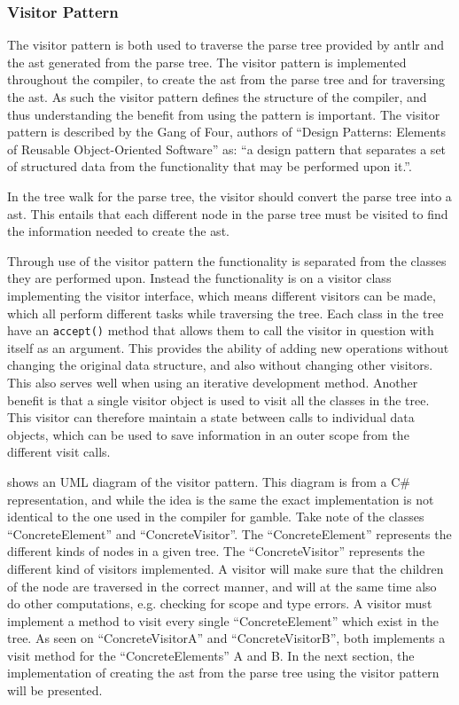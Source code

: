 \subsubsection*{Visitor Pattern}\label{subs:visit}
The visitor pattern is both used to traverse the parse tree provided by \gls{antlr} and the \acrshort{ast} generated from the parse tree.
The visitor pattern is implemented throughout the compiler, to create the \acrshort{ast} from the parse tree and for traversing the \acrshort{ast}.
As such the visitor pattern defines the structure of the compiler, and thus understanding the benefit from using the pattern is important.
The visitor pattern is described by the Gang of Four, authors of ``Design Patterns: Elements of Reusable Object-Oriented Software'' as:
``a design pattern that separates a set of structured data from the functionality that may be performed upon it.''. \citep{GOF}

In the tree walk for the parse tree, the visitor should convert the parse tree into a \acrshort{ast}.
This entails that each different node in the parse tree must be visited to find the information needed to create the \acrshort{ast}.

Through use of the visitor pattern the functionality is separated from the classes they are performed upon. 
Instead the functionality is on a visitor class implementing the visitor interface, which means different visitors can be made, which all perform different tasks while traversing the tree. 
Each class in the tree have an \texttt{accept()} method that allows them to call the visitor in question with itself as an argument.
This provides the ability of adding new operations without changing the original data structure, and also without changing other visitors.
This also serves well when using an iterative development method.
Another benefit is that a single visitor object is used to visit all the classes in the tree.
This visitor can therefore maintain a state between calls to individual data objects, which can be used to save information in an outer scope from the different visit calls.

 shows an UML diagram of the visitor pattern.
This diagram is from a C\# representation, and while the idea is the same the exact implementation is not identical to the one used in the compiler for \gls{gamble}.
Take note of the classes ``ConcreteElement'' and ``ConcreteVisitor''.
The ``ConcreteElement'' represents the different kinds of nodes in a given tree.
The ``ConcreteVisitor'' represents the different kind of visitors implemented.
A visitor will make sure that the children of the node are traversed in the correct manner, and will at the same time also do other computations, e.g. checking for scope and type errors.
A visitor must implement a method to visit every single ``ConcreteElement'' which exist in the tree.
As seen on  ``ConcreteVisitorA'' and ``ConcreteVisitorB'', both implements a visit method for the ``ConcreteElements'' A and B.
In the next section, the implementation of creating the \acrshort{ast} from the parse tree using the visitor pattern will be presented.

